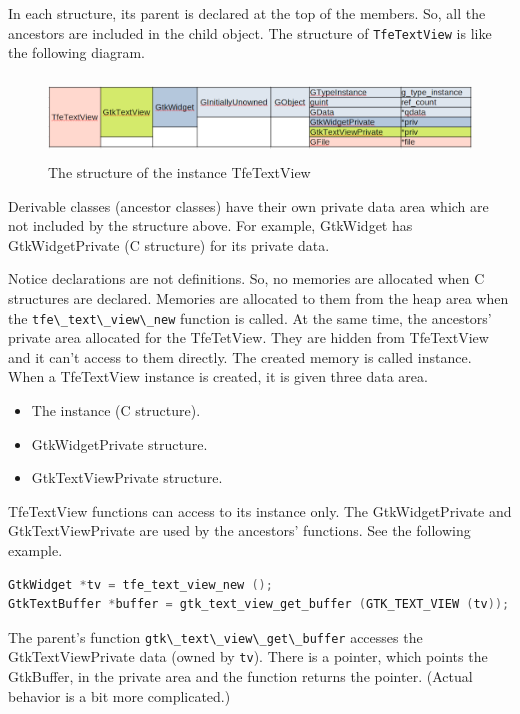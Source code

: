 In each structure, its parent is declared at the top of the members. So,
all the ancestors are included in the child object. The structure of
\passthrough{\lstinline!TfeTextView!} is like the following diagram.

\begin{figure}
\centering
\includegraphics[width=14.39cm,height=2.16cm]{../image/TfeTextView.png}
\caption{The structure of the instance TfeTextView}
\end{figure}

Derivable classes (ancestor classes) have their own private data area
which are not included by the structure above. For example, GtkWidget
has GtkWidgetPrivate (C structure) for its private data.

Notice declarations are not definitions. So, no memories are allocated
when C structures are declared. Memories are allocated to them from the
heap area when the \passthrough{\lstinline!tfe\_text\_view\_new!}
function is called. At the same time, the ancestors' private area
allocated for the TfeTetView. They are hidden from TfeTextView and it
can't access to them directly. The created memory is called instance.
When a TfeTextView instance is created, it is given three data area.

\begin{itemize}
\tightlist
\item
  The instance (C structure).
\item
  GtkWidgetPrivate structure.
\item
  GtkTextViewPrivate structure.
\end{itemize}

TfeTextView functions can access to its instance only. The
GtkWidgetPrivate and GtkTextViewPrivate are used by the ancestors'
functions. See the following example.

\begin{lstlisting}[language=C]
GtkWidget *tv = tfe_text_view_new ();
GtkTextBuffer *buffer = gtk_text_view_get_buffer (GTK_TEXT_VIEW (tv));
\end{lstlisting}

The parent's function
\passthrough{\lstinline!gtk\_text\_view\_get\_buffer!} accesses the
GtkTextViewPrivate data (owned by \passthrough{\lstinline!tv!}). There
is a pointer, which points the GtkBuffer, in the private area and the
function returns the pointer. (Actual behavior is a bit more
complicated.)

